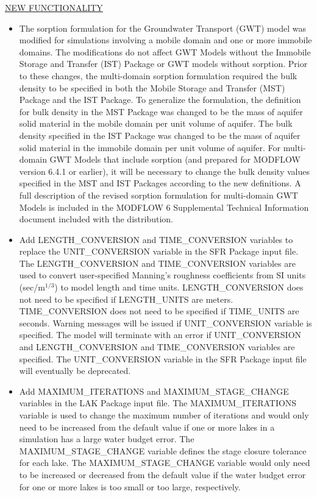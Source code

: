 	
	\item \currentmodflowversion
	
	\underline{NEW FUNCTIONALITY}
	\begin{itemize}
		\item The sorption formulation for the Groundwater Transport (GWT) model was modified for simulations involving a mobile domain and one or more immobile domains.  The modifications do not affect GWT Models without the Immobile Storage and Transfer (IST) Package or GWT models without sorption.  Prior to these changes, the multi-domain sorption formulation required the bulk density to be specified in both the Mobile Storage and Transfer (MST) Package and the IST Package.  To generalize the formulation, the definition for bulk density in the MST Package was changed to be the mass of aquifer solid material in the mobile domain per unit volume of aquifer.  The bulk density specified in the IST Package was changed to be the mass of aquifer solid material in the immobile domain per unit volume of aquifer.  For multi-domain GWT Models that include sorption (and prepared for MODFLOW version 6.4.1 or earlier), it will be necessary to change the bulk density values specified in the MST and IST Packages according to the new definitions.  A full description of the revised sorption formulation for multi-domain GWT Models is included in the MODFLOW 6 Supplemental Technical Information document included with the distribution.
		\item Add LENGTH\_CONVERSION and TIME\_CONVERSION variables to replace the UNIT\_CONVERSION variable in the SFR Package input file. The LENGTH\_CONVERSION and TIME\_CONVERSION variables are used to convert user-specified Manning's roughness coefficients from SI units (sec/m$^{1/3}$) to model length and time units. LENGTH\_CONVERSION does not need to be specified if LENGTH\_UNITS are meters. TIME\_CONVERSION does not need to be specified if TIME\_UNITS are seconds. Warning messages will be issued if UNIT\_CONVERSION variable is specified. The model will terminate with an error if UNIT\_CONVERSION and LENGTH\_CONVERSION and TIME\_CONVERSION variables are specified. The UNIT\_CONVERSION variable in the SFR Package input file will eventually be deprecated. 
		\item Add MAXIMUM\_ITERATIONS and MAXIMUM\_STAGE\_CHANGE variables in the LAK Package input file. The MAXIMUM\_ITERATIONS variable is used to change the maximum number of iterations and would only need to be increased from the default value if one or more lakes in a simulation has a large water budget error.  The MAXIMUM\_STAGE\_CHANGE variable defines the stage closure tolerance for each lake. The MAXIMUM\_STAGE\_CHANGE variable would only need to be increased or decreased from the default value if the water budget error for one or more lakes is too small or too large, respectively. 

\end{itemize}
